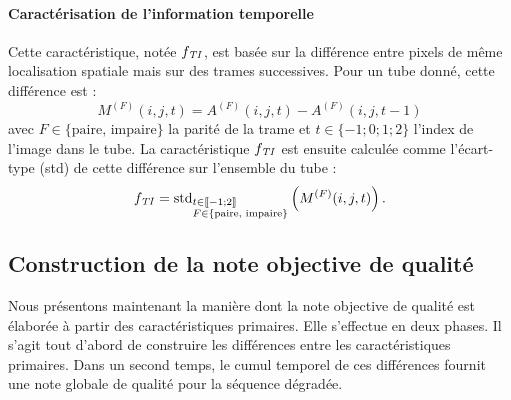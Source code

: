 \paragraph{Caractérisation de l'information temporelle}
Cette caractéristique, notée $f_{\mathit{TI}}$, est basée sur la différence entre pixels de même localisation spatiale mais sur des trames successives. Pour un tube donné, cette différence est :
\begin{equation}
M^{(F)}(i,j,t) = A^{(F)}(i,j,t) - A^{(F)}(i,j,t-1)
\end{equation}
%
avec $F\in \{\text{paire, impaire}\}$ la parité de la trame et $t\in\{-1; 0; 1; 2\}$ l'index de l'image dans le tube. La caractéristique $f_{\mathit{TI}}$ est ensuite calculée comme l'écart-type (std) de cette différence sur l'ensemble du tube :
\begin{equation}
f_{\mathit{TI}} = \text{std}_{\begin{subarray}{l}t\in\llbracket -1;2 \rrbracket\\ F\in \{\text{paire, impaire}\}\end{subarray}}\left( M^{(F)}(i,j,t) \right).
\end{equation}


\subsection{Construction de la note objective de qualité}
Nous présentons maintenant la manière dont la note objective de qualité est élaborée à partir des caractéristiques primaires. Elle s'effectue en deux phases. Il s'agit tout d'abord de construire les différences entre les caractéristiques primaires. Dans un second temps, le cumul temporel de ces différences fournit une note globale de qualité pour la séquence dégradée.


